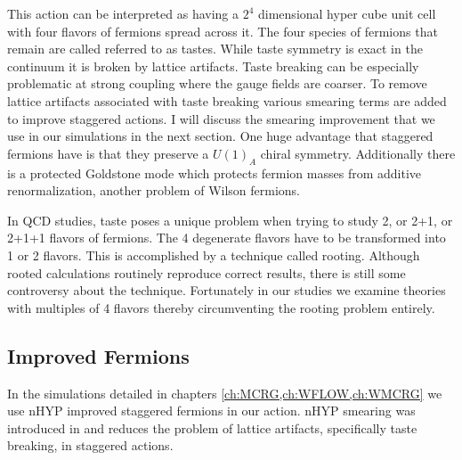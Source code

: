 This action can be interpreted as having a $2^4$ dimensional hyper cube unit cell with four flavors of fermions spread across it.
The four species of fermions that remain are called referred to as tastes.
While taste symmetry is exact in the continuum it is broken by lattice artifacts.
Taste breaking can be especially problematic at strong coupling where the gauge fields are coarser.
To remove lattice artifacts associated with taste breaking various smearing terms are added to improve staggered actions.
I will discuss the smearing improvement that we use in our simulations in the next section.
One huge advantage that staggered fermions have is that they preserve a $U(1)_A$ chiral symmetry.
Additionally there is a protected Goldstone mode which protects fermion masses from additive renormalization, another problem of Wilson fermions.

In QCD studies, taste poses a unique problem when trying to study 2, or 2+1, or 2+1+1 flavors of fermions.
The 4 degenerate flavors have to be transformed into 1 or 2 flavors.
This is accomplished by a technique called rooting.
Although rooted calculations routinely reproduce correct results, there is still some controversy about the technique.
Fortunately in our studies we examine theories with multiples of 4 flavors thereby circumventing the rooting problem entirely.

\subsection{Improved Fermions}

In the simulations detailed in chapters \ref{ch:MCRG,ch:WFLOW,ch:WMCRG} we use nHYP improved staggered fermions in our action.
nHYP smearing was introduced in \cite{ac5,34,2} and reduces the problem of lattice artifacts, specifically taste breaking, in staggered actions.

